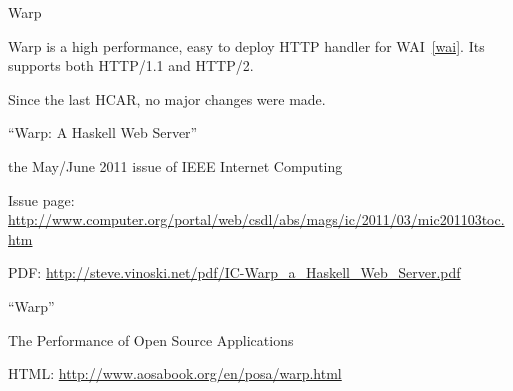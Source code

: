 \begin{hcarentry}[updated]{Warp}
\label{warp}
\makeheader

Warp is a high performance, easy to deploy HTTP handler for WAI~\cref{wai}.
Its supports both HTTP/1.1 and HTTP/2.

Since the last HCAR, no major changes were made.

\FurtherReading
\begin{compactitem}
\item``Warp: A Haskell Web Server''
  \begin{compactitem}
  \item the May/June 2011 issue of IEEE Internet Computing
  \item Issue page: \url{http://www.computer.org/portal/web/csdl/abs/mags/ic/2011/03/mic201103toc.htm}
  \item  PDF: \url{http://steve.vinoski.net/pdf/IC-Warp\_a\_Haskell\_Web\_Server.pdf}
  \end{compactitem}
\item ``Warp''
  \begin{compactitem}
  \item The Performance of Open Source Applications
  \item HTML: \url{http://www.aosabook.org/en/posa/warp.html}
  \end{compactitem}
\end{compactitem}
\end{hcarentry}
